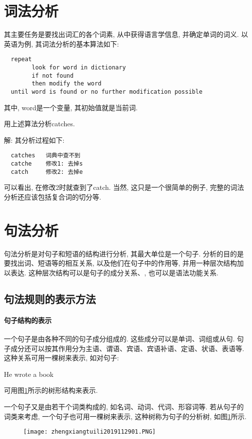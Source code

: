 \section{词法分析}
    其主要任务是要找出词汇的各个词素, 从中获得语言学信息, 并确定单词的词义. 以英语为例, 其词法分析的基本算法如下:
\begin{Verbatim}
  repeat
        look for word in dictionary
        if not found
        then modify the word
  until word is found or no further modification possible
\end{Verbatim}
其中, word是一个变量, 其初始值就是当前词.

\begin{example}
  用上述算法分析catches.
\end{example}

解: 其分析过程如下:
\begin{Verbatim}
  catches   词典中查不到
  catche    修改1: 去掉s
  catch     修改2: 去掉e
\end{Verbatim}

可以看出, 在修改2时就查到了catch. 当然, 这只是一个很简单的例子, 完整的词法分析还应该包括复合词的切分等.

\section{句法分析}
     句法分析是对句子和短语的结构进行分析, 其最大单位是一个句子. 分析的目的是要找出词、短语等的相互关系, 以及他们在句子中的作用等, 并用一种层次结构加以表达. 这种层次结构可以是句子的成分关系、, 也可以是语法功能关系.
\subsection{句法规则的表示方法}
\paragraph{句子结构的表示}
一个句子是由各种不同的句子成分组成的. 这些成分可以是单词、词组或从句. 句子成分还可以按其作用分为主语、谓语、宾语、宾语补语、定语、状语、表语等. 这种关系可用一棵树来表示, 如对句子:
\begin{center}
  He  wrote  a  book
\end{center}
可用图\ref{AI32fig2901}所示的树形结构来表示.

一个句子又是由若干个词类构成的, 如名词、动词、代词、形容词等. 若从句子的词类来考虑, 一个句子也可用一棵树来表示, 这种树称为句子的分析树, 如图\ref{AI32fig2901}所示.
\begin{figure}[H]
\centering
\texttt{[image: zhengxiangtuili2019112901.PNG]}
\caption{}
\label{AI32fig2901}
\end{figure}
